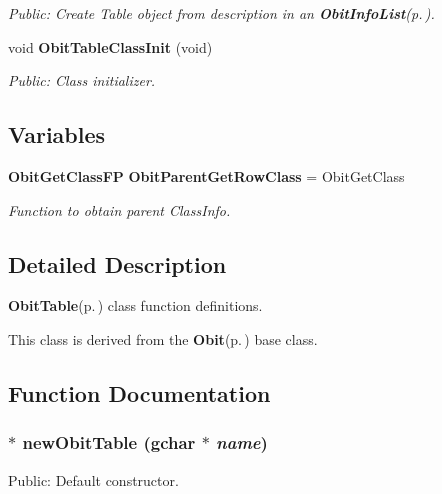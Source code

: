 \begin{CompactItemize}
\begin{CompactList}\small\item\em Public: Create Table object from description in an {\bf Obit\-Info\-List}{\rm (p.\,\pageref{structObitInfoList})}. \item\end{CompactList}\item 
void {\bf Obit\-Table\-Class\-Init} (void)
\begin{CompactList}\small\item\em Public: Class initializer. \item\end{CompactList}\end{CompactItemize}
\subsection*{Variables}
\begin{CompactItemize}
\item 
{\bf Obit\-Get\-Class\-FP} {\bf Obit\-Parent\-Get\-Row\-Class} = Obit\-Get\-Class
\begin{CompactList}\small\item\em Function to obtain parent Class\-Info. \item\end{CompactList}\end{CompactItemize}


\subsection{Detailed Description}
{\bf Obit\-Table}{\rm (p.\,\pageref{structObitTable})} class function definitions. 

This class is derived from the {\bf Obit}{\rm (p.\,\pageref{structObit})} base class.

\subsection{Function Documentation}
\subsubsection{$\ast$ new\-Obit\-Table (gchar $\ast$ {\em name})}\label{ObitTable_8c_a16}


Public: Default constructor. 

